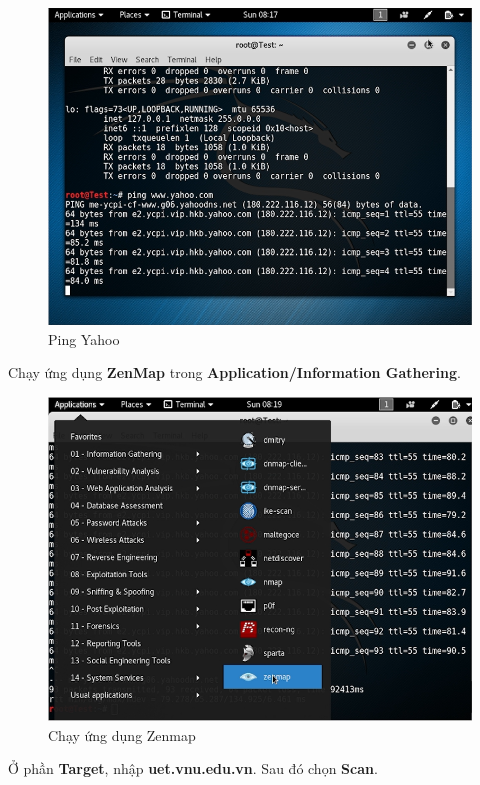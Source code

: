\begin{figure}[!htb]
    \centering
    \includegraphics[width=0.85\linewidth]{figure//chapter5//lab5_1/ping_yahoo.png}
    \caption{Ping Yahoo}
    \label{fig:enter-label}
\end{figure}

 Chạy ứng dụng \textbf{ZenMap} trong \textbf{Application/Information Gathering}.

\begin{figure}[!htb]
    \centering
    \includegraphics[width=0.85\linewidth]{figure//chapter5//lab5_1/zenmap.png}
    \caption{Chạy ứng dụng Zenmap}
    \label{fig:enter-label}
\end{figure}

 Ở phần \textbf{Target}, nhập \textbf{uet.vnu.edu.vn}. Sau đó chọn \textbf{Scan}.

